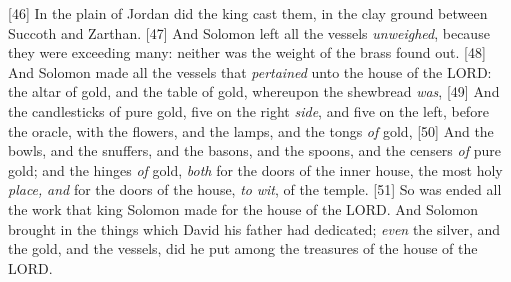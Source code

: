 [46] \textcolor[cmyk]{0.99998,1,0,0}{In the plain of Jordan did the king cast them, in the clay ground between Succoth and Zarthan.}
[47] \textcolor[cmyk]{0.99998,1,0,0}{And Solomon left all the vessels \emph{unweighed}, because they were exceeding many: neither was the weight of the brass found out.}
[48] \textcolor[cmyk]{0.99998,1,0,0}{And Solomon made all the vessels that \emph{pertained} unto the house of the LORD: the altar of gold, and the table of gold, whereupon the shewbread \emph{was},}
[49] \textcolor[cmyk]{0.99998,1,0,0}{And the candlesticks of pure gold, five on the right \emph{side}, and five on the left, before the oracle, with the flowers, and the lamps, and the tongs \emph{of} gold,}
[50] \textcolor[cmyk]{0.99998,1,0,0}{And the bowls, and the snuffers, and the basons, and the spoons, and the censers \emph{of} pure gold; and the hinges \emph{of} gold, \emph{both} for the doors of the inner house, the most holy \emph{place,} \emph{and} for the doors of the house, \emph{to} \emph{wit}, of the temple.}
[51] \textcolor[cmyk]{0.99998,1,0,0}{So was ended all the work that king Solomon made for the house of the LORD. And Solomon brought in the things which David his father had dedicated; \emph{even} the silver, and the gold, and the vessels, did he put among the treasures of the house of the LORD.}